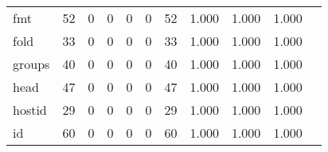 \begin{longtable}{lp{1.2cm}p{1.2cm}p{1.2cm}p{1.2cm}p{1.2cm}p{1.2cm}p{1.2cm}p{1.2cm}p{1.2cm}p{1.2cm}}
fmt       &                                    52 &                                                  0 &                                                  0 &                                                  0 &                                                  0 &                                                 52 &                                         1.000 &                                              1.000 &                                              1.000 \\
fold      &                                    33 &                                                  0 &                                                  0 &                                                  0 &                                                  0 &                                                 33 &                                         1.000 &                                              1.000 &                                              1.000 \\
groups    &                                    40 &                                                  0 &                                                  0 &                                                  0 &                                                  0 &                                                 40 &                                         1.000 &                                              1.000 &                                              1.000 \\
head      &                                    47 &                                                  0 &                                                  0 &                                                  0 &                                                  0 &                                                 47 &                                         1.000 &                                              1.000 &                                              1.000 \\
hostid    &                                    29 &                                                  0 &                                                  0 &                                                  0 &                                                  0 &                                                 29 &                                         1.000 &                                              1.000 &                                              1.000 \\
id        &                                    60 &                                                  0 &                                                  0 &                                                  0 &                                                  0 &                                                 60 &                                         1.000 &                                              1.000 &                                              1.000 \\

\end{longtable}
